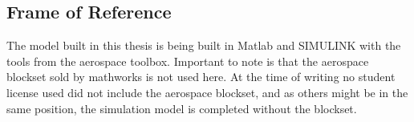 \subsection{Frame of Reference}

The model built in this thesis is being built in Matlab and SIMULINK with the tools from the aerospace toolbox. Important to note is that the aerospace blockset sold by mathworks is not used here. At the time of writing no student license used did not include the aerospace blockset, and as others might be in the same position, the simulation model is completed without the blockset. 

